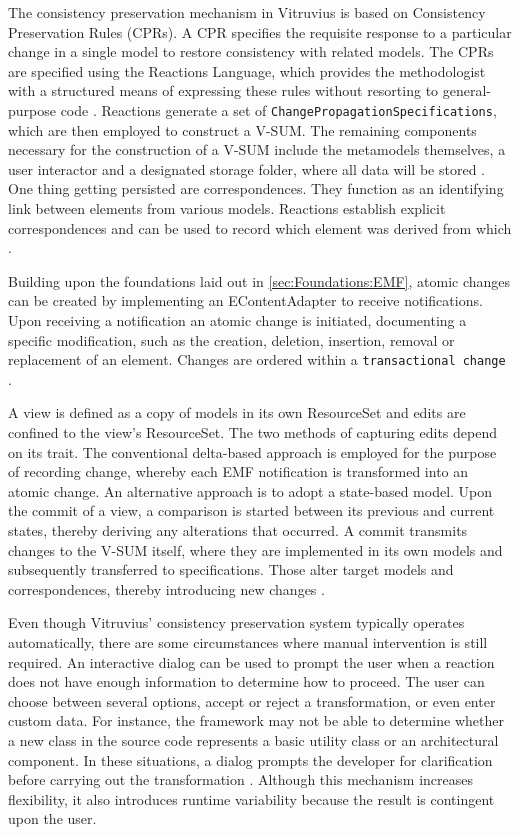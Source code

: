 The consistency preservation mechanism in Vitruvius is based on Consistency Preservation Rules (CPRs).
A CPR specifies the requisite response to a particular change in a single model to restore consistency with related models.
The CPRs are specified using the Reactions Language, which provides the methodologist with a structured means of expressing these rules without resorting to general-purpose code \cite{KLARE2021110815}.
Reactions generate a set of \texttt{ChangePropagationSpecifications}, which are then employed to construct a V-SUM.
The remaining components necessary for the construction of a V-SUM include the metamodels themselves, a user interactor and a designated storage folder, where all data will be stored \cite{vitruviusGithub}.
One thing getting persisted are correspondences.
They function as an identifying link between elements from various models.
Reactions establish explicit correspondences and can be used to record which element was derived from which \cite{KLARE2021110815}.

Building upon the foundations laid out in \autoref{sec:Foundations:EMF}, atomic changes can be created by implementing an EContentAdapter to receive notifications.
Upon receiving a notification an atomic change is initiated, documenting a specific modification, such as the creation, deletion, insertion, removal or replacement of an element.
Changes are ordered within a \texttt{transactional change} \cite{KLARE2021110815}.

A view is defined as a copy of models in its own ResourceSet and edits are confined to the view's ResourceSet.
The two methods of capturing edits depend on its trait.
The conventional delta-based approach is employed for the purpose of recording change, whereby each EMF notification is transformed into an atomic change.
An alternative approach is to adopt a state-based model.
Upon the commit of a view, a comparison is started between its previous and current states, thereby deriving any alterations that occurred.
A commit transmits changes to the V-SUM itself, where they are implemented in its own models and subsequently transferred to specifications.
Those alter target models and correspondences, thereby introducing new changes \cite{KLARE2021110815,wittler2023evaluating}.

Even though Vitruvius' consistency preservation system typically operates automatically, there are some circumstances where manual intervention is still required.
An interactive dialog can be used to prompt the user when a reaction does not have enough information to determine how to proceed.
The user can choose between several options, accept or reject a transformation, or even enter custom data.
For instance, the framework may not be able to determine whether a new class in the source code represents a basic utility class or an architectural component.
In these situations, a dialog prompts the developer for clarification before carrying out the transformation \cite{vitruviusGithub}.
Although this mechanism increases flexibility, it also introduces runtime variability because the result is contingent upon the user.

